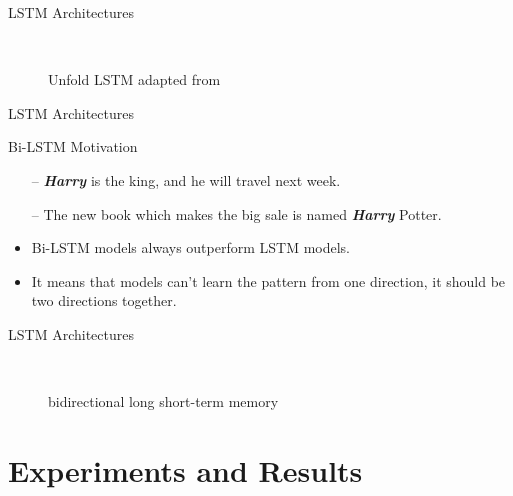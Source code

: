 \begin{frame}[fragile]{LSTM Architectures}
\begin{figure}[t]
	
	\endminipage\hfill
	
	\endminipage\hfill
	
	\endminipage
	\caption{Unfold LSTM adapted from~\cite{colah}}
	~\label{Fig:LSTM_Cell_Chaining}
\end{figure}%
\end{frame}


\begin{frame}[fragile]{LSTM Architectures}
\begin{block}{Bi-LSTM Motivation}
		\begin{itemize}
	\item[--] \textit{\textbf{Harry}} is the king, and he will travel next week.
	\item[--] The new book which makes the big sale is named \textit{\textbf{Harry}} Potter.
\end{itemize}
\end{block}

\begin{itemize}
	\item Bi-LSTM models always outperform LSTM models.
	\item It means that models can't learn the pattern from one direction, it
	should be two directions together.
\end{itemize}
\end{frame}

\begin{frame}[fragile]{LSTM Architectures}
\begin{center}
\begin{figure}[!t]
\centering

\caption{bidirectional long short-term memory~\cite{Gitrepo_NN_Tikz}}~\label{Fig:BI-LSTM}
\end{figure}
\end{center}
\end{frame}

\section{Experiments and Results}


